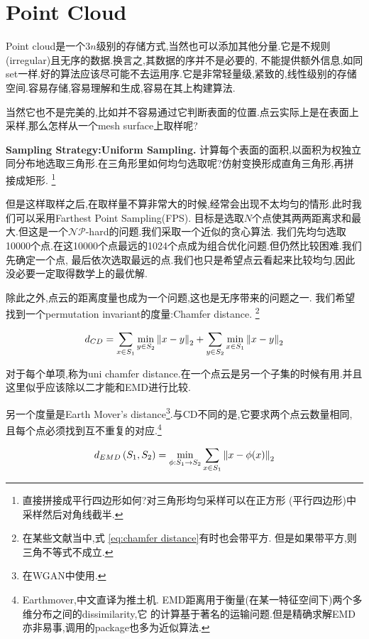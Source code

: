 \section{Point Cloud}

Point cloud是一个$3n$级别的存储方式,当然也可以添加其他分量.它是不规则(irregular)且无序的数据.换言之,其数据的序并不是必要的,
不能提供额外信息,如同set一样.好的算法应该尽可能不去运用序.它是非常轻量级,紧致的,线性级别的存储空间.容易存储,容易理解和生成,容易在其上构建算法.

当然它也不是完美的,比如并不容易通过它判断表面的位置.点云实际上是在表面上采样,那么怎样从一个mesh surface上取样呢?

\textbf{Sampling Strategy:Uniform Sampling.}
计算每个表面的面积,以面积为权独立同分布地选取三角形.在三角形里如何均匀选取呢?仿射变换形成直角三角形,再拼接成矩形.
\footnote{直接拼接成平行四边形如何?对三角形均匀采样可以在正方形 (平行四边形)中采样然后对角线截半.}

但是这样取样之后,在取样量不算非常大的时候,经常会出现不太均匀的情形.此时我们可以采用Farthest Point Sampling(FPS).
目标是选取$N$个点使其两两距离求和最大.但这是一个$\mathcal{NP}$-hard的问题.我们采取一个近似的贪心算法.
我们先均匀选取10000个点.在这10000个点最远的1024个点成为组合优化问题.但仍然比较困难.我们先确定一个点,
最后依次选取最远的点.我们也只是希望点云看起来比较均匀,因此没必要一定取得数学上的最优解.

除此之外,点云的距离度量也成为一个问题,这也是无序带来的问题之一.
我们希望找到一个permutation invariant的度量:Chamfer distance.
\footnote{在某些文献当中,式 \ref{eq:chamfer distance}有时也会带平方.
但是如果带平方,则三角不等式不成立.}

\begin{equation}
    d_{CD} = \sum_{x \in S_1} \min_{y \in S_2} \left \Vert x - y \right \Vert_{2} + \sum_{y \in S_2} \min_{x \in S_1} \left \Vert x - y \right \Vert_{2}
    \label{eq:chamfer distance}
\end{equation}

对于每个单项,称为uni chamfer distance.在一个点云是另一个子集的时候有用.并且这里似乎应该除以二才能和EMD进行比较.

另一个度量是Earth Mover's distance\footnote{在WGAN中使用.}.与CD不同的是,它要求两个点云数量相同,
且每个点必须找到互不重复的对应.\footnote{Earthmover,中文直译为推土机.
EMD距离用于衡量(在某一特征空间下)两个多维分布之间的dissimilarity,它
的计算基于著名的运输问题.但是精确求解EMD亦非易事,调用的package也多为近似算法.}

\begin{equation}
    d_{E M D}\left(S_{1}, S_{2}\right)=\min _{\phi: S_{1} \rightarrow S_{2}} \sum_{x \in S_{1}} \left \Vert x-\phi(x) \right \Vert_{2}
\end{equation}

